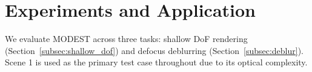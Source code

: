 \section{Experiments and Application}


We evaluate MODEST across three tasks: shallow DoF rendering (Section~\ref{subsec:shallow_dof}) and defocus deblurring (Section~\ref{subsec:deblur}). Scene 1 is used as the primary test case throughout due to its optical complexity.




